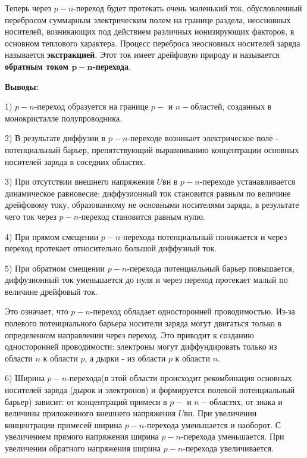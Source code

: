      \par Теперь через \(p-n\)-переход будет протекать очень маленький ток, обусловленный перебросом суммарным электрическим полем на границе раздела, неосновных носителей, возникающих под действием различных ионизирующих факторов, в основном теплового характера. Процесс переброса неосновных носителей заряда называется \textbf{экстракцией}. Этот ток имеет дрейфовую природу и называется \textbf{обратным током $\boldsymbol{p-n}$-перехода}.
     
     \par \textbf{Выводы:}
      
     \par 1) \(p-n\)-переход образуется на границе \(p-\) и \(n-\)областей, созданных в монокристалле полупроводника. 
     
     \par 2) В результате диффузии в \(p-n\)-переходе возникает электрическое поле - потенциальный барьер, препятствующий выравниванию концентрации основных носителей заряда в соседних областях.
     
     \par 3) При отсутствии внешнего напряжения \(U\)вн в \(p-n\)-переходе устанавливается динамическое равновесие: диффузионный ток становится равным по величине дрейфовому току, образованному не основными носителями заряда, в результате чего ток через \(p-n\)-переход становится равным нулю. 
      
     \par 4) При прямом смещении \(p-n\)-перехода потенциальный понижается и через переход протекает относительно большой диффузный ток.
     
     \par 5) При обратном смещении \(p-n\)-перехода потенциальный барьер повышается, диффузионный ток уменьшается до нуля и через переход протекает малый по величине дрейфовый ток.
     
     \par Это означает, что \(p-n\)-переход обладает односторонней проводимостью. Из-за полевого потенциального барьера носители заряда могут двигаться только в определенном направлении через переход. Это приводит к созданию односторонней проводимости: электроны могут диффундировать только из области \(n\) к области \(p\), а дырки - из области \(p\) к области \(n\).
     
     \par 6) Ширина \(p-n\)-перехода(в этой области происходит рекомбинация основных носителей заряда (дырок и электронов) и формируется полевой потенциальный барьер) зависит: от концентраций примеси в \(p-\) и \(n-\)областях, от знака и величины приложенного внешнего напряжения \(U\)вн. При увеличении концентрации примесей ширина \(p-n\)-перехода уменьшается и наоборот. С увеличением прямого напряжения ширина \(p-n\)-перехода уменьшается. При увеличении обратного напряжения ширина \(p-n\)-перехода увеличивается. 
     
